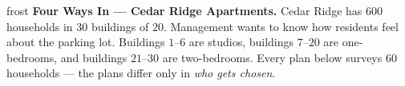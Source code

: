 \documentclass[10pt]{article}
\begin{document}

\vspace{0.15in}

\begin{headlinebox}{frost}
\small
\textbf{Four Ways In --- Cedar Ridge Apartments.} Cedar Ridge has $600$
households in $30$ buildings of $20$. Management wants to know how residents feel
about the parking lot. Buildings $1$--$6$ are studios, buildings $7$--$20$ are
one-bedrooms, and buildings $21$--$30$ are two-bedrooms. Every plan below
surveys $60$ households --- the plans differ only in \emph{who gets chosen}.
\end{headlinebox}

\vspace{0.1in}
\end{document}
